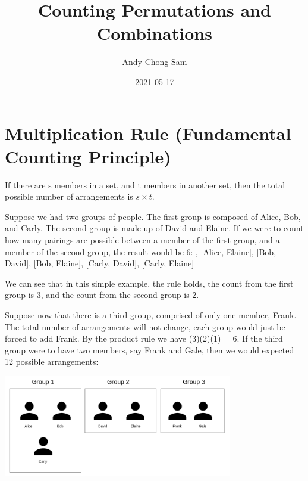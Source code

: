\documentclass{article}
\begin{document}
\title{Counting Permutations and Combinations}
\author{Andy Chong Sam}
\date{2021-05-17}
\maketitle

\section {Multiplication Rule (Fundamental Counting Principle)}

\par\noindent If there are s members in a set, and t members in another set, then the total possible number of arrangements is \( s\times t \). \; \; \; \; \; \; \; \; \; \; \; \; \; \; \; \; \; \; \; \; \; \; \; \; 
\linebreak

\par\noindent Suppose we had two groups of people. The first group is composed of Alice, Bob, and Carly. The second group is made up of David and Elaine. If we were to count how many pairings are possible between a member of the first group, and a member of the second group, the result would be 6: 
\newline
{}, [Alice, Elaine], [Bob, David], [Bob, Elaine], [Carly, David], [Carly, Elaine]
\newline

\par\noindent We can see that in this simple example, the rule holds, the count from the first group is 3, and the count from the second group is 2.
\newline
\par\noindent Suppose now that there is a third group, comprised of only one member, Frank. The total number of arrangements will not change, each group would just be forced to add Frank. By the product rule we have (3)(2)(1) = 6. If the third group were to have two members, say Frank and Gale, then we would expected 12 possible arrangements: 
\newline

\begin{center}
	\includegraphics[width=10cm]{perm-comb-4.png}
\end{center}
\end{document}
